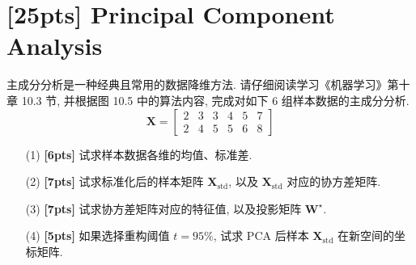 \documentclass[a4paper,UTF8]{article}
\numberwithin{equation}{section}
\theoremstyle{definition}
\def \X {\mathbf{X}}
\def \W {\mathbf{W}}
\begin{document}


\section{[25pts] Principal Component Analysis}
主成分分析是一种经典且常用的数据降维方法. 请仔细阅读学习《机器学习》第十章 10.3 节, 并根据图 10.5 中的算法内容, 完成对如下 6 组样本数据的主成分分析. 
        \[
        \X = \begin{bmatrix}
            2&3&3&4&5&7\\
            2&4&5&5&6&8
        \end{bmatrix}
        \]
        
\begin{enumerate}
    \item[(1)] \textbf{[6pts]} 试求样本数据各维的均值、标准差.
    \item[(2)] \textbf{[7pts]} 试求标准化后的样本矩阵 $\X_{\text{std}}$, 以及 $\X_{\text{std}}$ 对应的协方差矩阵.
    \item[(3)] \textbf{[7pts]} 试求协方差矩阵对应的特征值, 以及投影矩阵 $\W^\star$. 
    \item[(4)] \textbf{[5pts]} 如果选择重构阈值 $t=95\%$, 试求 PCA 后样本 $\X_{\text{std}}$ 在新空间的坐标矩阵.
\end{enumerate}

 
\end{document}
